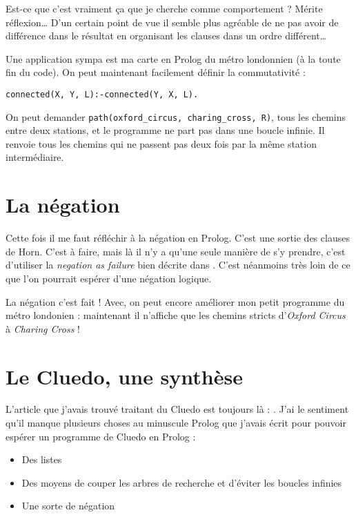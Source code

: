 \documentclass{article}
\begin{document}
Est-ce que c'est vraiment ça que je cherche comme comportement ? Mérite réflexion\ldots{} D'un certain point de vue il semble plus agréable de ne pas avoir de différence dans le résultat en organisant les clauses dans un ordre différent\ldots{}

Une application sympa est ma carte en Prolog du métro londonnien (à la toute fin du code). On peut maintenant facilement définir la commutativité :

\texttt{connected(X,\ Y,\ L):-connected(Y,\ X,\ L).}

On peut demander \texttt{path(oxford\_circus,\ charing\_cross,\ R)}, tous les chemins entre deux stations, et le programme ne part pas dans une boucle infinie. Il renvoie tous les chemins qui ne passent pas deux fois par la même station intermédiaire.

\section{La négation}

Cette fois il me faut réfléchir à la négation en Prolog. C'est une sortie des clauses de Horn. C'est à faire, mais là il n'y a qu'une seule manière de s'y prendre, c'est d'utiliser la \emph{negation as failure} bien décrite dans \cite{Clark}. C'est néanmoins très loin de ce que l'on pourrait espérer d'une négation logique.

La négation c'est fait ! Avec, on peut encore améliorer mon petit programme du métro londonien : maintenant il n'affiche que les chemins stricts d'\emph{Oxford Circus} à \emph{Charing Cross} !

\section{Le Cluedo, une synthèse}

L'article que j'avais trouvé traitant du Cluedo est toujours là : \cite{Aartun}. J'ai le sentiment qu'il manque plusieurs choses au minuscule Prolog que j'avais écrit pour pouvoir espérer un programme de Cluedo en Prolog :

\begin{itemize}
  \item
    Des listes
  \item
    Des moyens de couper les arbres de recherche et d'éviter les boucles infinies
  \item
    Une sorte de négation
\end{itemize}
\end{document}
